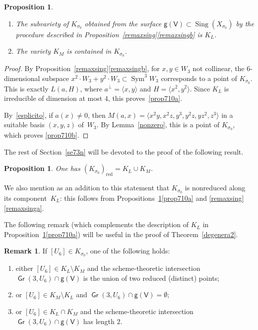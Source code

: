 \documentclass[JEP,XML,SOM,Unicode, NoEqCountersInSection,NoFloatCountersInSection]{cedram}
\newenvironment{enumeratea}
{\bgroup\def\theenumi{\alph{enumi}}\def\theenumii{\arabic{enumii}}\begin{enumerate}}
{\end{enumerate}\egroup}
\newtheorem{prop}[lemm]{Proposition}
\theoremstyle{definition}
\newtheorem{rema}[lemm]{Remark}
\newcommand\sfg{\mathsf{g}}
\newcommand\sfV{\mathsf{V}}
\newcommand\gv{\sfg(\sfV)}
\DeclareMathOperator{\Gr}{\mathsf{Gr}}
\let\la\langle
\let\ra\rangle
\DeclareMathOperator{\Sing}{Sing}\let\sing\Sing
\DeclareMathOperator{\Sym}{Sym}
\begin{document}
\skpt
\begin{prop}\label{prop710}
\begin{enumeratea}
\item\label{prop710a}
The subvariety of $K_{\sigma_0}$ obtained from the surface $\gv \subset \Sing(X_{\sigma_0} )$ by the procedure described in Proposition~\ref{remaxsing}\eqref{remaxsingb} is $K_L$.

\item\label{prop710b}
The variety $K_M$ is contained in $K_{\sigma_0}$.
\end{enumeratea}
\end{prop}

\begin{proof}
By Proposition~\ref{remaxsing}\eqref{remaxsingb}, for $x,y\in W_3$ not collinear, the $6$-dimensional subspace $x^2\cdot W_3+y^2\cdot W_3\subset \Sym^3\! W_{3}$ corresponds to a point of $K_{\sigma_0}$. This is exactly $L(a,H)$, where $a^\perp=\la x,y\ra $ and $H=\la x^2,y^2\ra$. Since $K_L$ is irreducible of dimension at most $4$, this proves~\eqref{prop710a}.

By~\eqref{esplicito}, if $a(x)\ne 0$, then $M(a,x)=
\la x^2 y,x^2 z,y^3,y^2 z, y z^2,z^3 \ra $ in a suitable basis $(x,y,z)$ of~$W_{3}$. By Lemma~\ref{nonzero}, this is a point of $K_{\sigma_0}$, which proves \eqref{prop710b}.
\end{proof}

The rest of Section~\ref{se73n} will be devoted to the proof of the following result.

\begin{prop}\label{kappapi}
One has $(K_{\sigma_0})_\mathrm{red} =K_L\cup K_M$.
\end{prop}

We also mention as an addition to this statement that $K_{\sigma_0}$ is nonreduced along its component~$K_L$: this follows from Propositions~\ref{prop710}\eqref{prop710a} and \ref{remaxsing}\eqref{remaxsinga}.

The following remark (which complements the description of $K_L$ in Proposition~\ref{prop710}\eqref{prop710a})
will be useful in the proof of Theorem~\ref{degenera2}.

\begin{rema}\label{interver}
If $[U_6]\in K_{\sigma_0}$, one of the following holds:
\begin{enumeratea}
\item\label{intervera}
either $[U_6]\in K_L \setminus K_M$ and the scheme-theoretic intersection $\Gr(3,U_6)\cap \gv$ is the union of two reduced (distinct) points;
\item\label{interverb}
or $[U_6]\in K_M \setminus K_L $ and $\Gr(3,U_6)\cap \gv=\emptyset$;
\item\label{interverc}
or $[U_6]\in K_L \cap K_M $ and the scheme-theoretic intersection $\Gr(3,U_6)\cap \gv$ has length $2$.
\end{enumeratea}
\end{rema}
\end{document}
